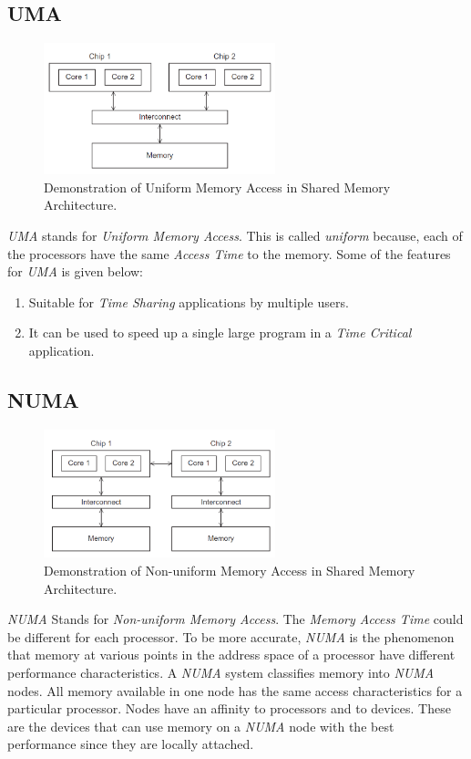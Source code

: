 \documentclass[12pt]{article}
\numberwithin{equation}{section}
\numberwithin{table}{section}
\numberwithin{figure}{section}
\begin{document}
\subsection*{UMA}
\begin{figure}[!h]\centering
	\includegraphics[width=0.6\textwidth]{UMA_1.png}
	\caption{Demonstration of Uniform Memory Access in Shared Memory Architecture.}
	\label{figsolplot}
\end{figure}
\textit{UMA} stands for \textit{Uniform Memory Access}. This is called \textit{uniform} because, each of the processors have the same \textit{Access Time} to the memory. Some of the features for \textit{UMA} is given below:
\begin{enumerate}
	\item Suitable for \textit{Time Sharing} applications by multiple users.
	\item It can be used to speed up a single large program in a \textit{Time Critical} application.
\end{enumerate}
\subsection*{NUMA}
\begin{figure}[!h]\centering
	\includegraphics[width=0.6\textwidth]{NUMA_1.png}
	\caption{Demonstration of Non-uniform Memory Access in Shared Memory Architecture.}
	\label{figsolplot}
\end{figure}
\textit{NUMA} Stands for \textit{Non-uniform Memory Access}. The \textit{Memory Access Time} could be different for each processor. To be more accurate, \textit{NUMA} is the phenomenon that memory at various points in the address space of a processor have different performance characteristics. A \textit{NUMA} system classifies memory into \textit{NUMA} nodes. All memory available in one node has the same access characteristics for a particular processor. Nodes have an affinity to processors and to devices. These are the devices that can use memory on a \textit{NUMA} node with the best performance since they are locally attached.\cite{NUMA}
\end{document}
